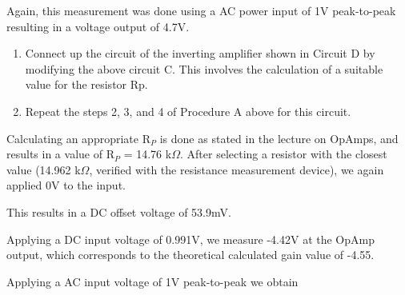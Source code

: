 Again, this measurement was done using a AC power input of 1V peak-to-peak  resulting in a voltage output of 4.7V.




\begin{enumerate}
	\item Connect up the circuit of the inverting amplifier shown in Circuit D by modifying the
above circuit C. This involves the calculation of a suitable value for the resistor Rp.
\item Repeat the steps 2, 3, and 4 of Procedure A above for this circuit.

\end{enumerate}

Calculating an appropriate R$_P$ is done as stated in the lecture on OpAmps, and results in a value of R$_P$ = 14.76 k$\Omega$. After selecting a resistor with the closest value (14.962 k$\Omega$, verified with the resistance measurement device), we again applied 0V to the input.

This results in a DC offset voltage of 53.9mV.

Applying a DC input voltage of 0.991V, we measure -4.42V at the OpAmp output, which corresponds to the theoretical calculated gain value of -4.55.

Applying a AC input voltage of 1V peak-to-peak we obtain 





